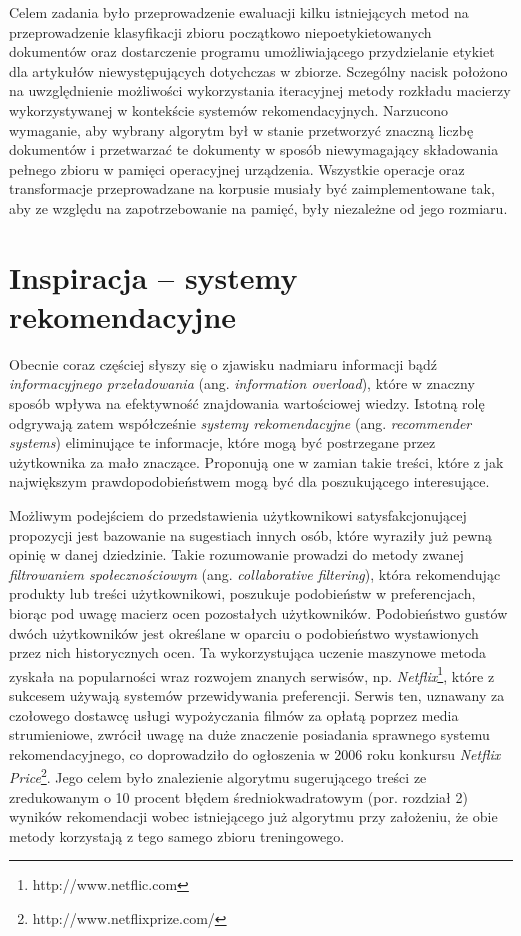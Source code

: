 \documentclass{pracamgr}
\begin{document}
Celem zadania było przeprowadzenie ewaluacji kilku istniejących metod na przeprowadzenie klasyfikacji zbioru początkowo niepoetykietowanych dokumentów oraz dostarczenie programu umożliwiającego przydzielanie etykiet dla artykułów niewystępujących dotychczas w zbiorze. Sczególny nacisk położono na uwzględnienie możliwości wykorzystania iteracyjnej metody rozkładu macierzy wykorzystywanej w kontekście systemów rekomendacyjnych. Narzucono wymaganie, aby wybrany algorytm był w stanie przetworzyć znaczną liczbę dokumentów i przetwarzać te dokumenty w sposób niewymagający składowania pełnego zbioru w pamięci operacyjnej urządzenia. Wszystkie operacje oraz transformacje przeprowadzane na korpusie musiały być zaimplementowane tak, aby ze względu na zapotrzebowanie na pamięć, były niezależne od jego rozmiaru.

\section{Inspiracja – systemy rekomendacyjne}

Obecnie coraz częściej słyszy się o zjawisku nadmiaru informacji bądź \textit{informacyjnego przeładowania} (ang. \textit{information overload}), które w znaczny sposób wpływa na efektywność znajdowania wartościowej wiedzy. Istotną rolę odgrywają zatem współcześnie \textit{systemy rekomendacyjne} (ang. \textit{recommender systems}) eliminujące te informacje, które mogą być postrzegane przez użytkownika za mało znaczące. Proponują one w zamian takie treści, które z jak największym prawdopodobieństwem mogą być dla poszukującego interesujące.

Możliwym podejściem do przedstawienia użytkownikowi satysfakcjonującej propozycji jest bazowanie na sugestiach innych osób, które wyraziły już pewną opinię w danej dziedzinie. Takie rozumowanie prowadzi do metody zwanej \textit{filtrowaniem społecznościowym} (ang. \textit{collaborative filtering}), która rekomendując produkty lub treści użytkownikowi, poszukuje podobieństw w preferencjach, biorąc pod uwagę macierz ocen pozostałych użytkowników. Podobieństwo gustów dwóch użytkowników jest określane w oparciu o podobieństwo wystawionych przez nich historycznych ocen. Ta wykorzystująca uczenie maszynowe metoda zyskała na popularności wraz rozwojem znanych serwisów, np. \textit{Netflix}\footnote{http://www.netflic.com}, które z sukcesem używają systemów przewidywania preferencji. Serwis ten, uznawany za czołowego dostawcę usługi wypożyczania filmów za opłatą poprzez media strumieniowe, zwrócił uwagę na duże znaczenie posiadania sprawnego systemu rekomendacyjnego, co doprowadziło do ogłoszenia w 2006 roku konkursu \textit{Netflix Price}\footnote{ http://www.netflixprize.com/}. Jego celem było znalezienie algorytmu sugerującego treści ze zredukowanym o 10 procent błędem średniokwadratowym (por. rozdział 2) wyników rekomendacji wobec istniejącego już algorytmu przy założeniu, że obie metody korzystają z tego samego zbioru treningowego.
\end{document}
